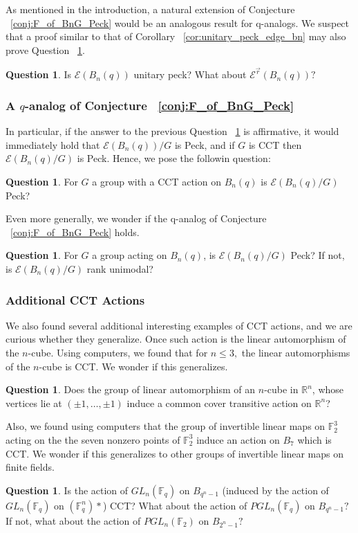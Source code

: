 \documentclass[10 pt]{amsart}
\theoremstyle{plain}
\theoremstyle{definition}
\newtheorem{question}[thm]{Question}
\theoremstyle{remark}
\numberwithin{equation}{section}
\newcommand\sssec{\subsubsection}
\newcommand\BF{{\mathbb F}}
\newcommand\BR{{\mathbb R}}
\renewcommand{\vec}[1]{\overrightarrow{#1}}
\begin{document}
As mentioned in the introduction, a natural extension of Conjecture ~\ref{conj:F_of_BnG_Peck} would be an analogous result for q-analogs. We suspect that a proof similar to that of Corollary ~\ref{cor:unitary_peck_edge_bn} may also prove Question ~\ref{question:unitary_peck_q_edge}.

\begin{question}
\label{question:unitary_peck_q_edge}
Is $\mathcal E(B_n(q))$ unitary peck? What about $\mathcal E^{\vec r}(B_n(q))?$
\end{question}

\sssec{A $q$-analog of Conjecture ~\ref{conj:F_of_BnG_Peck}}

In particular, if the answer to the previous Question ~\ref{question:unitary_peck_q_edge} is affirmative, it would immediately hold that $\mathcal E(B_n(q))/G$ is Peck, and if $G$ is CCT then $\mathcal E(B_n(q)/G)$ is Peck. Hence, we pose the followin question: 

\begin{question}
For $G$ a group with a CCT action on $B_n(q)$ is $\mathcal E(B_n(q)/G)$ Peck?
\end{question}

Even more generally, we wonder if the q-analog of Conjecture ~\ref{conj:F_of_BnG_Peck} holds.

\begin{question}
For $G$ a group acting on $B_n(q)$, is $\mathcal E(B_n(q)/G)$ Peck? If not, is $\mathcal E(B_n(q)/G)$ rank unimodal?
\end{question}

\sssec{Additional CCT Actions}

We also found several additional interesting examples of CCT actions, and we are curious whether they generalize. Once such action is the linear automorphism of the $n$-cube. Using computers, we found that for $n \leq 3,$ the linear automorphisms of the $n$-cube is CCT. We wonder if this generalizes.

\begin{question}
Does the group of linear automorphism of an $n$-cube in $\BR^n$, whose vertices lie at $(\pm 1, \ldots, \pm 1)$ induce a common cover transitive action on $\BR^n$?
\end{question}

Also, we found using computers that the group of invertible linear maps on $\BF_2^3$ acting on the the seven nonzero points of $\BF_2^3$ induce an action on $B_7$ which is CCT. We wonder if this generalizes to other groups of invertible linear maps on finite fields.

\begin{question}
Is the action of $GL_n(\BF_q)$ on $B_{q^n-1}$ (induced by the action of $GL_n(\BF_q)$ on $(\BF_q^n)*$) CCT? What about the action of $PGL_n(\BF_q)$ on $B_{q^n-1}?$ If not, what about the action of $PGL_n(\BF_2)$ on $B_{2^n-1}?$ 
\end{question}



\end{document}
